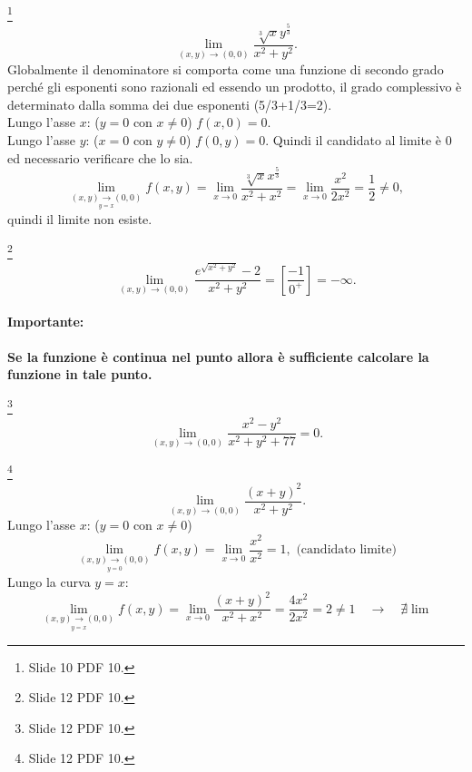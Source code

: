 \begin{example}\footnote{Slide 10 PDF 10.}
    \begin{equation*}
        \lim\limits_{(x,y)\rightarrow(0,0)}\frac{\sqrt[3]{x}y^{\frac{5}{3}}}{x^2+y^2}.
    \end{equation*}
    Globalmente il denominatore si comporta come una funzione di secondo grado perché gli esponenti sono razionali ed essendo un prodotto, il grado complessivo è determinato dalla somma dei due esponenti (5/3+1/3=2).\\
    Lungo l'asse $x$: ($y=0$ con $x\neq 0$) $f(x,0)=0$.\\
    Lungo l'asse $y$: ($x=0$ con $y\neq 0$) $f(0, y)=0$.
    Quindi il candidato al limite è 0 ed necessario verificare che lo sia.
    \begin{equation*}
        \lim\limits_{\underset{y=x}{(x,y)\rightarrow(0,0)}}f(x,y)=\lim\limits_{x\rightarrow 0}\frac{\sqrt[3]{x}x^{\frac{5}{3}}}{x^2+x^2}=\lim\limits_{x\rightarrow 0}\frac{x^2}{2x^2}=\frac{1}{2}\neq 0,
    \end{equation*}
    quindi il limite non esiste.
\end{example}

\begin{example}\footnote{Slide 12 PDF 10.}
    \begin{equation*}
        \lim\limits_{(x,y)\rightarrow(0,0)}\frac{e^{\sqrt{x^2+y^2}}-2}{x^2+y^2}=\left[\frac{-1}{0^+}\right]=-\infty.
    \end{equation*}
\end{example}

\paragraph{Importante: } \textbf{Se la funzione è continua nel punto allora è sufficiente calcolare la funzione in tale punto.}

\begin{example}\footnote{Slide 12 PDF 10.}
    \begin{equation*}
        \lim\limits_{(x,y)\rightarrow(0,0)}\frac{x^2-y^2}{x^2+y^2+77}=0.
    \end{equation*}
\end{example}

\begin{example}\footnote{Slide 12 PDF 10.}
    \begin{equation*}
        \lim\limits_{(x,y)\rightarrow(0,0)}\frac{(x+y)^2}{x^2+y^2}.
    \end{equation*}
    Lungo l'asse $x$: ($y=0$ con $x\neq 0$)
    \begin{equation*}
        \lim\limits_{\underset{y=0}{(x,y)\rightarrow(0,0)}}f(x,y)=\lim\limits_{x\rightarrow 0}\frac{x^2}{x^2}=1, \text{ (candidato limite)}
    \end{equation*}
    Lungo la curva $y=x$:
    \begin{equation*}
        \lim\limits_{\underset{y=x}{(x,y)\rightarrow(0,0)}}f(x,y)=\lim\limits_{x\rightarrow 0}\frac{(x+y)^2}{x^2+x^2} = \frac{4x^2}{2x^2}=2\neq 1\quad\longrightarrow\quad\nexists\lim
    \end{equation*}
\end{example}

